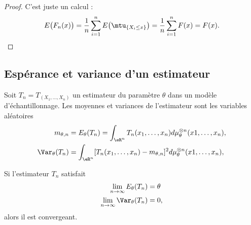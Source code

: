 \begin{proof}
    C'est juste un calcul :
    \begin{equation}
        E\big( F_n(x) \big)=\frac{1}{ n }\sum_{i=1}^nE\big( \mtu_{\{ X_i\leq x \}} \big)=\frac{1}{n }\sum_{i=1}^nF(x)=F(x).
    \end{equation}
\end{proof}


\subsection{Espérance et variance d'un estimateur}

Soit \( T_n=T_(X_1,\ldots,X_n)\) un estimateur du paramètre \( \theta\) dans un modèle d'échantillonnage. Les moyennes et variances de l'estimateur sont les variables aléatoires
\begin{subequations}
    \begin{align}
        m_{\theta,n}&=E_{\theta}(T_n)=\int_{\eR^n}T_n(x_1,\ldots,x_n)d\mu_{\theta}^{\otimes n}(x1,\ldots,x_n),\\
        \Var_{\theta}(T_n)&=\int_{\eR^n}[T_n(x_1,\ldots,x_n)-m_{\theta,n}]^2d\mu_{\theta}^{\otimes n}(x1,\ldots,x_n),
    \end{align}
\end{subequations}

\begin{lemma}
    Si l'estimateur \( T_n\) satisfait
    \begin{subequations}
        \begin{align}
            \lim_{n\to \infty} E_{\theta}(T_n)&=\theta\\
            \lim_{n\to \infty} \Var_{\theta}(T_n)&=0,
        \end{align}
    \end{subequations}
    alors il est convergeant.
\end{lemma}

